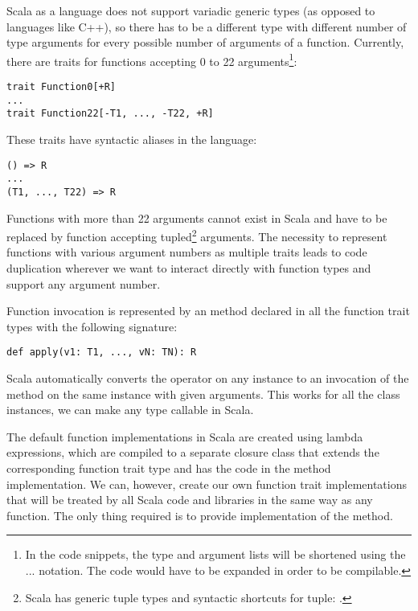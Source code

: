 Scala as a language does not support variadic generic types (as opposed to languages like C++), so there has to be a different type with different number of type arguments for every possible number of arguments of a function. Currently, there are traits for functions accepting 0 to 22 arguments\footnote{In the code snippets, the type and argument lists will be shortened using the ... notation. The code would have to be expanded in order to be compilable.}:

\lstset{style=Scala}
\begin{lstlisting}
trait Function0[+R]
...
trait Function22[-T1, ..., -T22, +R]
\end{lstlisting}

These traits have syntactic aliases in the language:

\lstset{style=Scala}
\begin{lstlisting}
() => R
...
(T1, ..., T22) => R
\end{lstlisting}

Functions with more than 22 arguments cannot exist in Scala and have to be replaced by function accepting tupled\footnote{Scala has generic tuple types and syntactic shortcuts for tuple: .} arguments. The necessity to represent functions with various argument numbers as multiple traits leads to code duplication wherever we want to interact directly with function types and support any argument number.

Function invocation is represented by an  method declared in all the function trait types with the following signature:
\lstset{style=Scala}
\begin{lstlisting}
def apply(v1: T1, ..., vN: TN): R
\end{lstlisting}

Scala automatically converts the \inlinecode{()} operator on any instance to an invocation of the  method on the same instance with given arguments. This works for all the class instances, we can make any type callable in Scala.

The default function implementations in Scala are created using lambda expressions, which are compiled to a separate closure class that extends the corresponding function trait type and has the code in the  method implementation. We can, however, create our own function trait implementations that will be treated by all Scala code and libraries in the same way as any function. The only thing required is to provide implementation of the  method.

